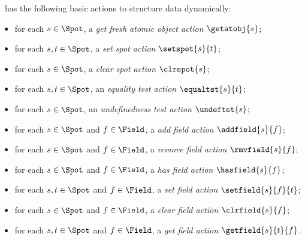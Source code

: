 \documentclass[fleqn]{llncs}
\begin{document}
\DLD\ has the following basic actions to structure data dynamically:
\begin{itemize}
\item
for each $s \in \Spot$,
a \emph{get fresh atomic object action} $\getatobj{s}$;
\item
for each $s,t \in \Spot$, a \emph{set spot action} $\setspot{s}{t}$;
\item
for each $s \in \Spot$, a \emph{clear spot action} $\clrspot{s}$;
\item
for each $s,t \in \Spot$,
an \emph{equality test action} $\equaltst{s}{t}$;
\item
for each $s \in \Spot$,
an \emph{undefinedness test action} $\undeftst{s}$;
\item
for each $s \in \Spot$ and $f \in \Field$,
a \emph{add field action} $\addfield{s}{f}$;
\item
for each $s \in \Spot$ and $f \in \Field$,
a \emph{remove field action} $\rmvfield{s}{f}$;
\item
for each $s \in \Spot$ and $f \in \Field$,
a \emph{has field action} $\hasfield{s}{f}$;
\item
for each $s,t \in \Spot$ and $f \in \Field$,
a \emph{set field action} $\setfield{s}{f}{t}$;
\item
for each $s \in \Spot$ and $f \in \Field$,
a \emph{clear field action} $\clrfield{s}{f}$;
\item
for each $s,t \in \Spot$ and $f \in \Field$,
a \emph{get field action} $\getfield{s}{t}{f}$.
\end{itemize}
\end{document}
